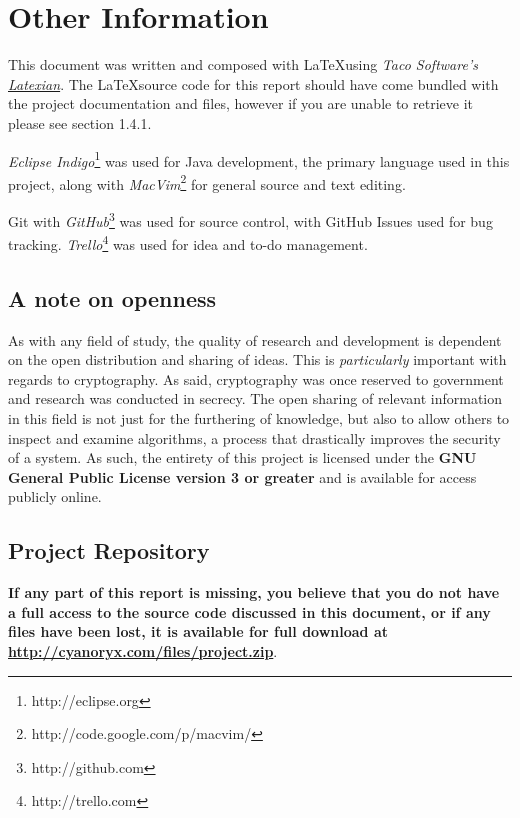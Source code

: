 \section{Other Information}

This document was written and composed with \LaTeX using \emph{Taco Software's \href{http://tacosw.com/latexian/}{Latexian}}. The \LaTeX source code for this report should have come bundled with the project documentation and files, however if you are unable to retrieve it please see section 1.4.1.

\emph{Eclipse Indigo}\footnote{http://eclipse.org} was used for Java development, the primary language used in this project, along with \emph{MacVim}\footnote{http://code.google.com/p/macvim/} for general source and text editing.

Git with \emph{GitHub}\footnote{http://github.com} was used for source control, with GitHub Issues used for bug tracking. \emph{Trello}\footnote{http://trello.com} was used for idea and to-do management.

\subsection{A note on openness}

As with any field of study, the quality of research and development is dependent on the open distribution and sharing of ideas. This is \emph{particularly} important with regards to cryptography. As said, cryptography was once reserved to government and research was conducted in secrecy. The open sharing of relevant information in this field is not just for the furthering of knowledge, but also to allow others to inspect and examine algorithms, a process that drastically improves the security of a system. As such, the entirety of this project is licensed under the \textbf{GNU General Public License version 3 or greater} and is available for access publicly online.

\subsection{Project Repository} \label{sec:repo}

\textbf{If any part of this report is missing, you believe that you do not have a full access to the source code discussed in this document, or if any files have been lost, it is available for full download at \url{http://cyanoryx.com/files/project.zip}}. 